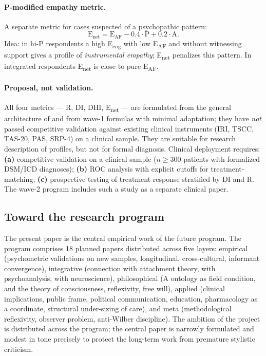 \paragraph{P-modified empathy metric.} A separate metric for cases suspected of a psychopathic pattern:
\[
\text{E}_{\mathrm{net}} = \text{E}_{\mathrm{AF}} - 0.4 \cdot \text{P} + 0.2 \cdot \text{A}.
\]
Idea: in hi-P respondents a high E\textsubscript{cog} with low E\textsubscript{AF} and without witnessing support gives a profile of \emph{instrumental empathy}; E\textsubscript{net} penalizes this pattern. In integrated respondents E\textsubscript{net} is close to pure E\textsubscript{AF}.

\paragraph{Proposal, not validation.} All four metrics --- R, DI, DHI, E\textsubscript{net} --- are formulated from the general architecture of \DEIC{} and from wave-1 formulas with minimal adaptation; they have \emph{not} passed competitive validation against existing clinical instruments (IRI, TSCC, TAS-20, PAS, SRP-4) on a clinical sample. They are suitable for research description of profiles, but not for formal diagnosis. Clinical deployment requires: \textbf{(a)} competitive validation on a clinical sample ($n \geq 300$ patients with formalized DSM/ICD diagnoses); \textbf{(b)} ROC analysis with explicit cutoffs for treatment-matching; \textbf{(c)} prospective testing of treatment response stratified by DI and R. The wave-2 program includes such a study as a separate clinical paper.

\subsection{Toward the research program}

The present paper is the central empirical work of the future \DEIC{} program. The program comprises 18 planned papers distributed across five layers: empirical (psychometric validations on new samples, longitudinal, cross-cultural, informant convergence), integrative (connection with attachment theory, with psychoanalysis, with neuroscience), philosophical (A ontology as field condition, \DEIC{} and the theory of consciousness, reflexivity, free will), applied (clinical implications, public frame, political communication, education, pharmacology as a \DEIC{} coordinate, structural under-sizing of care), and meta (methodological reflexivity, observer problem, anti-Wilber discipline). The ambition of the project is distributed across the program; the central paper is narrowly formulated and modest in tone precisely to protect the long-term work from premature stylistic criticism.

